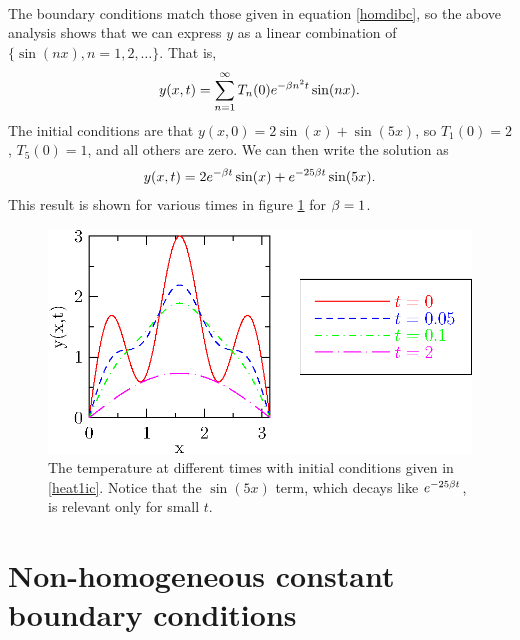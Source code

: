 \documentclass{book}
\begin{document}
\\
{
  The boundary conditions match those given in equation \eqref{homdibc}, so
  the above analysis shows that we can express $y$ as a linear combination
  of $\{\sin(nx),n=1,2,\dots\}$. That is,
  \begin{align*}
  y(x,t)=\sum_{n=1}^\infty T_n(0) e^{-\beta n^2 t} \sin(nx).
  \end{align*}
  The initial conditions are that $y(x,0)=2\sin(x)+\sin(5x)$, so $T_1(0)=2$,
  $T_5(0)=1$, and all others are zero. We can then write the solution as
  \begin{align*}
  y(x,t) = 2 e^{-\beta t} \sin(x) + e^{-25 \beta t} \sin(5x).
  \end{align*}
 This result is shown for various times in figure \ref{heat1} for $\beta=1$.
  \begin{figure}[htbp]
    \begin{center}
      \includegraphics{201/heat1}
      \caption{The temperature at different times with initial conditions
        given in \eqref{heat1ic}. Notice that the $\sin(5x)$ term, which
        decays like $e^{-25 \beta t}$, is relevant only for small $t$. }
      \label{heat1}
    \end{center}
  \end{figure}
}


\section{Non-homogeneous constant boundary conditions}
\end{document}
